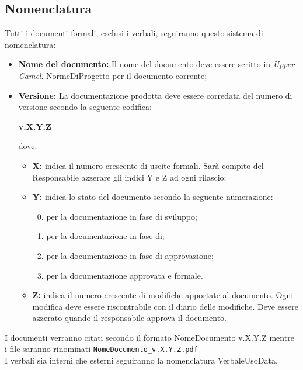 \subsection{Nomenclatura}
Tutti i documenti formali, esclusi i verbali, seguiranno questo sistema di nomenclatura:
\begin{itemize}
	\item \textbf{Nome del documento:} Il nome del documento deve essere scritto in \textit{Upper Camel}.
	NormeDiProgetto per il documento corrente;
	\item \textbf{Versione:} La documentazione prodotta deve essere corredata del numero di versione secondo la seguente codifica:
	
	\textbf{v.X.Y.Z}
	
	dove:
	\begin{itemize}
		\item \textbf{X:} indica il numero crescente di uscite formali. Sarà compito del Responsabile azzerare gli indici Y e Z ad ogni rilascio;
		\item \textbf{Y:} indica lo stato del documento secondo la seguente numerazione:
		\begin{enumerate}
			\setcounter{enumi}{-1}
			\item per la documentazione in fase di sviluppo;
			\item per la documentazione in fase di;
			\item per la documentazione in fase di approvazione;
			\item per la documentazione approvata e formale.
		\end{enumerate}
		\item \textbf{Z:} indica il numero crescente di modifiche apportate al documento. Ogni modifica deve essere riscontrabile con il diario delle modifiche. Deve essere azzerato quando il responsabile approva il documento. 	
	\end{itemize}
\end{itemize}

I documenti verranno citati secondo il formato NomeDocumento v.X.Y.Z mentre i file saranno rinominati \texttt{NomeDocumento\_v.X.Y.Z.pdf} \\
I verbali sia interni che esterni seguiranno la nomenclatura VerbaleUsoData.

